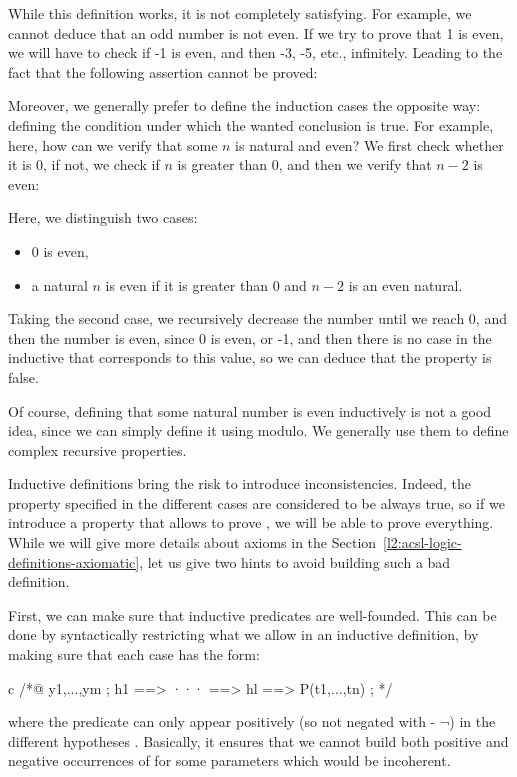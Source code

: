 While this definition works, it is not completely satisfying. For example, we
cannot deduce that an odd number is not even. If we try to prove that 1 is even,
we will have to check if -1 is even, and then -3, -5, etc., infinitely. Leading
to the fact that the following assertion cannot be proved:





Moreover, we generally prefer to define the induction cases the opposite way:
defining the condition under which the wanted conclusion is true. For example,
here, how can we verify that some $n$ is natural and even? We first check
whether it is 0, if not, we check if $n$ is greater than $0$, and then we verify
that $n-2$ is even:






Here, we distinguish two cases:
\begin{itemize}
\item 0 is even,
\item a natural $n$ is even if it is greater than 0 and $n-2$ is an even
      natural.
\end{itemize}

Taking the second case, we recursively decrease the number until we reach
0, and then the number is even, since 0 is even, or -1, and then there
is no case in the inductive that corresponds to this value, so we can
deduce that the property is false.




Of course, defining that some natural number is even inductively is not a
good idea, since we can simply define it using modulo. We generally use them
to define complex recursive properties.




Inductive definitions bring the risk to introduce inconsistencies. Indeed, the
property specified in the different cases are considered to be always true, so
if we introduce a property that allows to prove , we will be
able to prove everything. While we will give more details about axioms in the
Section~\ref{l2:acsl-logic-definitions-axiomatic}, let us give two hints to
avoid building such a bad definition.

First, we can make sure that inductive predicates are well-founded. This can
be done by syntactically restricting what we allow in an inductive definition,
by making sure that each case has the form:
\begin{CodeBlock}{c}
/*@
  \forall y1,...,ym ; h1 ==> ··· ==> hl ==> P(t1,...,tn) ;
*/
\end{CodeBlock}
where the predicate  can only appear positively (so not negated
with \CodeInline{!} - $\neg$) in the different hypotheses .
Basically, it ensures that we cannot build both positive and negative
occurrences of  for some parameters which would be incoherent.

